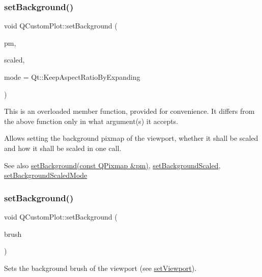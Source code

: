 \subsubsection{\texorpdfstring{set\+Background()}{setBackground()}\hspace{0.1cm}{\footnotesize\ttfamily [2/3]}}
{\footnotesize\ttfamily void Q\+Custom\+Plot\+::set\+Background (\begin{DoxyParamCaption}\item[{const Q\+Pixmap \&}]{pm,  }\item[{bool}]{scaled,  }\item[{Qt\+::\+Aspect\+Ratio\+Mode}]{mode = {\ttfamily Qt\+:\+:KeepAspectRatioByExpanding} }\end{DoxyParamCaption})}

This is an overloaded member function, provided for convenience. It differs from the above function only in what argument(s) it accepts.

Allows setting the background pixmap of the viewport, whether it shall be scaled and how it shall be scaled in one call.

\begin{DoxySeeAlso}{See also}
\hyperlink{class_q_custom_plot_a130358592cfca353ff3cf5571b49fb00}{set\+Background(const Q\+Pixmap \&pm)}, \hyperlink{class_q_custom_plot_a36f0fa1317325dc7b7efea615ee2de1f}{set\+Background\+Scaled}, \hyperlink{class_q_custom_plot_a4c0eb4865b7949f62e1cb97db04a3de0}{set\+Background\+Scaled\+Mode} 
\end{DoxySeeAlso}
\mbox{\label{class_q_custom_plot_a8ed256cf467bfa7ba1f9feaae62c3bd0}} 
\subsubsection{\texorpdfstring{set\+Background()}{setBackground()}\hspace{0.1cm}{\footnotesize\ttfamily [3/3]}}
{\footnotesize\ttfamily void Q\+Custom\+Plot\+::set\+Background (\begin{DoxyParamCaption}\item[{const Q\+Brush \&}]{brush }\end{DoxyParamCaption})}

Sets the background brush of the viewport (see \hyperlink{class_q_custom_plot_a3f9bc4b939dd8aaba9339fd09f273fc4}{set\+Viewport}).

